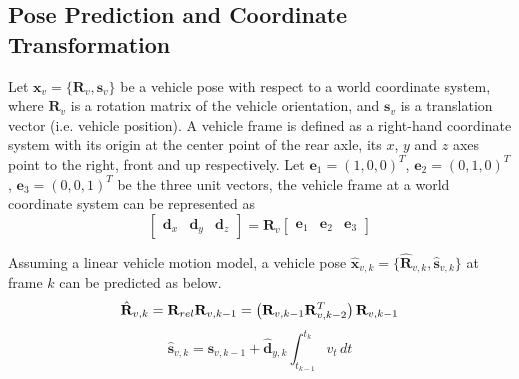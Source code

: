 \documentclass[letterpaper, 10 pt, conference]{ieeeconf}  %
\begin{document}
%

\subsection{Pose Prediction and Coordinate Transformation}
Let $\mathbf{x}_{v} = \{\mathbf{R}_{v}, \mathbf{s}_{v}\}$ be a vehicle pose with respect to a world coordinate system, where $\mathbf{R}_{v}$ is a rotation matrix of the vehicle orientation, and $\mathbf{s}_{v}$ is a translation vector (i.e. vehicle position).
A vehicle frame is defined as a right-hand coordinate system with its origin at the center point of the rear axle, its $x$, $y$ and $z$ axes point to the right, front and up respectively. Let $\mathbf{e}_1=(1,0,0)^T$, $\mathbf{e}_2=(0,1,0)^T$, $\mathbf{e}_3=(0,0,1)^T$ be the three unit vectors, the vehicle frame at a world coordinate system can be represented as
\begin{equation}
\begin{bmatrix} \mathbf{d}_x & \mathbf{d}_y & \mathbf{d}_z \end{bmatrix}
= \mathbf{R}_v
\begin{bmatrix} \mathbf{e}_1 & \mathbf{e}_2 & \mathbf{e}_3 \end{bmatrix}
\end{equation}

Assuming a linear vehicle motion model, a vehicle pose $\hat{\mathbf{x}}_{v,k}=\{\hat{\mathbf{R}}_{v,k},\hat{\mathbf{s}}_{v,k}\}$ at frame $k$ can be predicted as below.
\begin{equation}
\hat{\mathbf{R}}_{v,k}=\mathbf{R}_{rel}\mathbf{R}_{v,k-1}=\left(\mathbf{R}_{v,k-1}\mathbf{R}_{v,k-2}^T\right)\mathbf{R}_{v,k-1}\\
\label{eq:R_t_predict}
\end{equation}
\begin{equation}
\hat{\mathbf{s}}_{v,k}= \mathbf{s}_{v,k-1} + \hat{\mathbf{d}}_{y,k} \int_{t_{k-1}}^{t_k}{v_t}\,dt
\end{equation}
\end{document}
